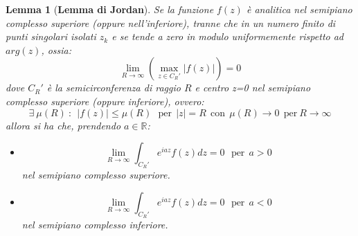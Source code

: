 \documentclass[twoside]{article}
\newtheorem{lemma}[theorem]{Lemma}
\begin{document}
\begin{lemma}[\textbf{Lemma di Jordan}]\label{Air Jordan}
Se la funzione $f(z)$ è analitica nel semipiano complesso superiore (oppure nell'inferiore), tranne che in un numero finito di punti singolari isolati $z_k$ e se tende a zero in modulo uniformemente rispetto ad $arg(z)$, ossia:
\begin{equation}
    \lim_{R\to \infty}\left(\max_{z \in C_R '} |f(z)| \right)=0
\end{equation}
dove $C_R '$ è la semicirconferenza di raggio $R$ e centro z=0 nel semipiano complesso superiore (oppure inferiore), ovvero:
\begin{equation}
    \exists \ \mu(R) \ : \ \ |f(z)|\le \mu(R) \ \ \ \text{per} \ \ |z|=R \ \ \text{con} \ \ \mu(R)\to 0 \ \ \text{per} \ R \to \infty
\end{equation}
allora si ha che, prendendo $a \in \mathds{R}$:
\begin{itemize}
    \item \begin{equation}
        \lim_{R\to \infty}\int_{C_R'}e^{iaz}f(z) dz =0 \ \ \ \text{per} \ \ a>0
    \end{equation}
    nel semipiano complesso superiore.
    \item \begin{equation}
        \lim_{R\to \infty}\int_{C_R'}e^{iaz}f(z)dz=0 \ \ \ \text{per} \ \ a<0
    \end{equation}
    nel semipiano complesso inferiore.
\end{itemize}
\end{lemma}
\end{document}
